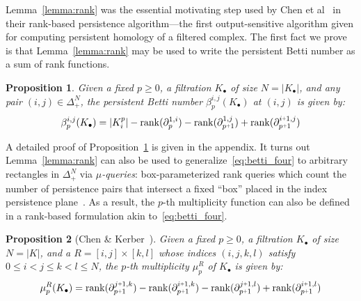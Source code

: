 \documentclass[10pt]{article}
\numberwithin{equation}{section}
\newcommand{\+}{%
	\raisebox{0.18ex}{\scaleobj{0.55}{+}}
}
\newtheorem{proposition}{Proposition}
\theoremstyle{definition}
\begin{document}
Lemma~\ref{lemma:rank} was the essential motivating step used by Chen et al~\cite{chen2011output} in their rank-based persistence algorithm---the first output-sensitive algorithm given for computing persistent homology of a filtered complex.
The first fact we prove is that Lemma~\ref{lemma:rank} may be used to write the persistent Betti number as a sum of rank functions. 
\begin{proposition}\label{prop:rank_reduction}
Given a fixed $p \geq 0$, a filtration $K_\bullet$ of size $N = \lvert K_\bullet \rvert$, and any pair $(i,j) \in \Delta_+^N$, the persistent Betti number $\beta_p^{i,j}(K_\bullet)$ at $(i,j)$ is given by:
	\begin{equation}\label{eq:betti_four}
	\beta_p^{i,j}(K_\bullet) = \lvert K_i^p \rvert - \mathrm{rank}(\partial_p^{1,i}) - \mathrm{rank}(\partial_{p\+1 }^{1,j}) + \mathrm{rank}(\partial_{p\+1}^{i \+ 1, j} )
	\end{equation}
\end{proposition}
\noindent A detailed proof of Proposition~\ref{prop:rank_reduction} is given in the appendix. It turns out Lemma~\ref{lemma:rank} can also be used to generalize~\eqref{eq:betti_four} to arbitrary rectangles in $\Delta_+^N$ via $\mu$\emph{-queries}: box-parameterized rank queries which count the number of persistence pairs that intersect a fixed ``box'' placed in the index persistence plane~\cite{chen2011output}. 
As a result, the $p$-th multiplicity function can also be defined in a rank-based formulation akin to~\eqref{eq:betti_four}. 
\begin{proposition}[Chen \& Kerber~\cite{chen2011output}]\label{prop:mu_reduction}
Given a fixed $p \geq 0$, a filtration $K_\bullet$ of size $N = \lvert K \rvert$, and a $R = [i,j] \times [k,l]$ whose indices $(i,j,k,l)$ satisfy $0 \leq i < j \leq k < l \leq N$, the $p$-th multiplicity $\mu_p^{R}$ of $K_\bullet$ is given by:
	\begin{equation}\label{eq:mu_four}
	\mu_p^{R}(K_\bullet) = \mathrm{rank}(\partial_{p\+1}^{j \+ 1, k})  - \mathrm{rank}(\partial_{p\+1}^{i \+ 1, k})  - \mathrm{rank}(\partial_{p\+1}^{j \+ 1, l}) + \mathrm{rank}(\partial_{p\+1}^{i \+ 1, l}) 
	\end{equation}
\end{proposition}
\end{document}
